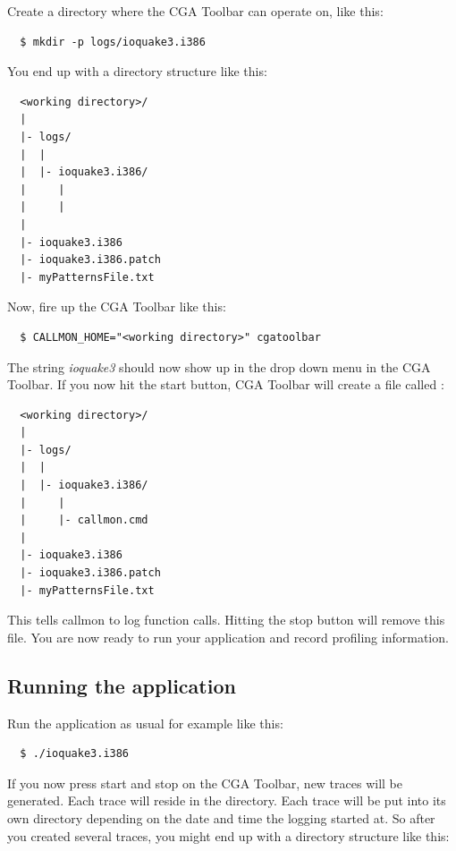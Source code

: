 Create a directory where the CGA Toolbar can operate on, like this:

\begin{verbatim}
  $ mkdir -p logs/ioquake3.i386
\end{verbatim}

You end up with a directory structure like this:

\begin{verbatim}
  <working directory>/
  |
  |- logs/
  |  |
  |  |- ioquake3.i386/
  |     |
  |     |
  |
  |- ioquake3.i386
  |- ioquake3.i386.patch
  |- myPatternsFile.txt
\end{verbatim}

Now, fire up the CGA Toolbar like this:

\begin{verbatim}
  $ CALLMON_HOME="<working directory>" cgatoolbar
\end{verbatim}

The string \emph{ioquake3} should now show up in the drop down menu in the CGA Toolbar. If you now hit the start button, CGA Toolbar will create a file called :

\begin{verbatim}
  <working directory>/
  |
  |- logs/
  |  |
  |  |- ioquake3.i386/
  |     |
  |     |- callmon.cmd
  |
  |- ioquake3.i386
  |- ioquake3.i386.patch
  |- myPatternsFile.txt
\end{verbatim}

This tells callmon to log function calls. Hitting the stop button will remove this file. You are now ready to run your application and record profiling information.

\subsection{Running the application}

Run the application as usual for example like this:

\begin{verbatim}
  $ ./ioquake3.i386
\end{verbatim}

If you now press start and stop on the CGA Toolbar, new traces will be generated. Each trace will reside in the  directory. Each trace will be put into its own directory depending on the date and time the logging started at. So after you created several traces, you might end up with a directory structure like this:   

